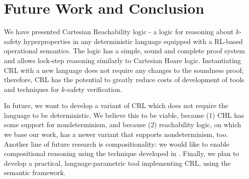 \section{Future Work and Conclusion}

We have presented Cartesian Reachability logic - a logic for reasoning about $k$-safety hyperproperties
in any deterministic language equipped with a RL-based operational semantics.
The logic has a simple, sound and complete proof system and allows lock-step reasoning
similarly to Cartesian Hoare logic.
Instantiating CRL with a new language does not require any changes to the soundness proof;
therefore, CRL has the potential to greatly reduce costs of development of tools and techniques for $k$-safety verification.

In future, we want to develop a variant of CRL which does not require the language to be deterministic.
We believe this to be viable, because (1) CHL has some support for nondeterminism,
and because (2) reachability logic, on which we base our work, has a newer variant that supports nondeterminism, too.
Another line of future research is compositionality: we would like to enable compositional reasoning
using the technique developed in \cite{DOsualdoFD22}.
Finally, we plan to develop a practical, language-parametric tool implementing CRL, using the \K{} semantic framework.
